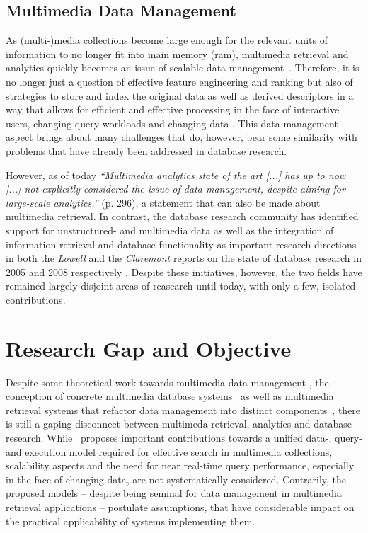 \subsection{Multimedia Data Management}

As (multi-)media collections become large enough for the relevant units of information to no longer fit into main memory (\acrshort{ram}), multimedia retrieval and analytics quickly becomes an issue of scalable data management~\cite{Jonson:2016Ten,Pouyanfar:2018}. Therefore, it is no longer just a question of effective feature engineering and ranking but also of strategies to store and index the original data as well as derived descriptors in a way that allows for efficient and effective processing in the face of interactive users, changing query workloads and changing data \cite{Smeulders:2000Content}. This data management aspect brings about many challenges that do, however, bear some similarity with problems that have already been addressed in database research.

However, as of today \emph{``Multimedia analytics state of the art [...] has up to now [...] not explicitly considered the issue of data management, despite aiming for large-scale analytics.''} \cite{Jonson:2016Ten} (p. 296), a statement that can also be made about multimedia retrieval. In contrast, the database research community has identified support for unstructured- and multimedia data as well as the integration of information retrieval and database functionality as important research directions in both the \emph{Lowell} and the \emph{Claremont} reports on the state of database research in 2005 and 2008 respectively \cite{Abiteboul:2005Lowell,Agrawal:2008Claremont}. Despite these initiatives, however, the two fields have remained largely disjoint areas of reasearch until today, with only a few, isolated contributions.

\section{Research Gap and Objective}
\label{section:research_gap}

Despite some theoretical work towards multimedia data management \cite{Marcus:1996Foundations,Adjeroh:1997Multimedia}, the conception of concrete multimedia database systems~\cite{Giangreco:2016Adam,Yang:2020Pase,Wang:2021Milvus} as well as multimedia retrieval systems that refactor data management into distinct components~\cite{Carey:1995Towards,Rossetto:2016Vitrivr,Gasser:2019Multimodal}, there is still a gaping disconnect between multimeda retrieval, analytics and database research. While~\cite{Giangreco:2018Database} proposes important contributions towards a unified data-, query- and execution model required for effective search in multimedia collections, scalability aspects and the need for near real-time query performance, especially in the face of changing data, are not systematically considered. Contrarily, the proposed models -- despite being seminal for data management in multimedia retrieval applications -- postulate assumptions, that have considerable impact on the practical applicability of systems implementing them.

